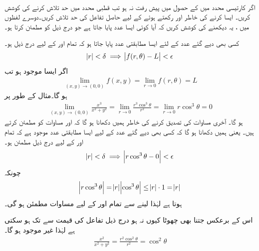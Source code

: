 \\
اگر کارتیسی محدد میں   کے حصول میں پیش رفت  نہ ہو تب قطبی محدد  میں حد تلاش کرنے کی کوشش کریں۔ ایسا کرنے  کی خاطر  اور   رکھتے  ہوئے   کے لیے حاصل تفاعل کی حد تلاش کریں۔دوسرے لفظوں  میں ، یہ دیکھنے کی کوشش کریں کہ آیا کوئی ایسا عدد  پایا جاتا ہے جو درج ذیل کو مطمئن کرتا ہو۔

کسی بھی دیے گئے عدد  کے لئے   ایسا مطابقتی عدد  پایا جاتا ہو کہ تمام  اور  کے لیے درج ذیل ہو۔
\begin{align*}
\abs{r}<\delta\implies \abs{f(r,\theta)-L}<\epsilon
\end{align*}
اگر ایسا  موجود ہو تب
\begin{align}\label{مساوات_کثیرالمتغیر_قطبی_حد_الف}
\lim_{(x,y)\to(0,0)}f(x,y)=\lim_{r\to 0}f(r,\theta)=L
\end{align}
ہو گا۔مثال کے طور پر 
\begin{align*}
\lim_{(x,y)\to(0,0)}\frac{x^3}{x^2+y^2}=\lim_{r\to 0}\frac{r^3\cos^3\theta}{r^2}=\lim_{r\to 0}r\cos^3\theta=0
\end{align*}
ہو گا۔ آخری  مساوات  کی تصدیق کرنے کی خاطر ہمیں دکھانا  ہو گا کہ  اور   مساوات  کو مطمئن کرتے ہیں۔ یعنی ہمیں دکھانا ہو گا کہ کسی بھی دیے گئے عدد  کے لیے ایسا مطابقتی  عدد  موجود ہے کہ  تمام  اور  کے لیے درج ذیل  مطمئن ہو۔
\begin{align}\label{مساوات_کثیرالمتغیر_قطبی_حد_ب}
\abs{r}<\delta\implies \abs{r\cos^3\theta-0}<\epsilon
\end{align}
چونکہ
\begin{align*}
\abs{r\cos^3\theta}=\abs{r}\abs{\cos^3\theta}\le \abs{r}\cdot 1=\abs{r}
\end{align*}
ہوتا ہے لہٰذا   لینے سے تمام  اور  کے لیے مساوات  مطمئن ہو گی۔

اس کے برعکس     جتنا بھی چھوٹا کیوں نہ  ہو   درج ذیل تفاعل کی قیمت   سے   تک ہو سکتی ہے لہٰذا  غیر موجود ہو گا۔
\begin{align*}
\frac{x^2}{x^2+y^2}=\frac{r^2\cos^2\theta}{r^2}=\cos^2\theta
\end{align*}

